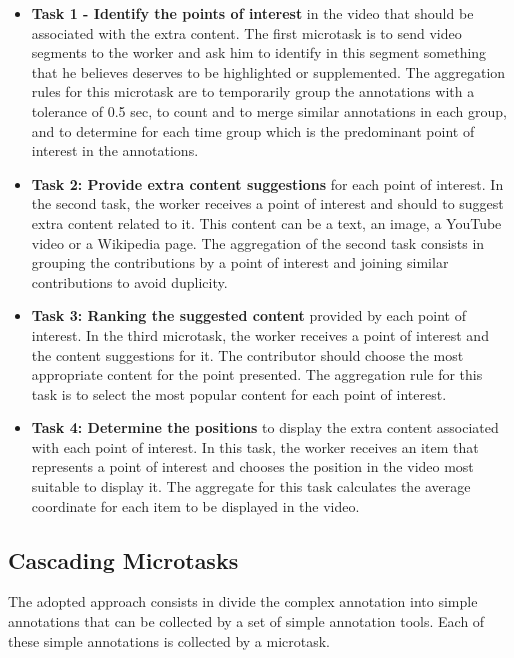 \begin{itemize}
\item \textbf{Task 1 - Identify the points of interest} in the video that should be associated with the extra content. The first microtask is to send video segments to the worker and ask him to identify in this segment something that he believes deserves to be highlighted or supplemented. The aggregation rules for this microtask are to temporarily group the annotations with a tolerance of 0.5 sec, to count and to merge similar annotations in each group, and to determine for each time group which is the predominant point of interest in the annotations.

\item \textbf{Task 2: Provide extra content suggestions} for each point of interest. In the second task, the worker receives a point of interest and should to suggest extra content related to it. This content can be a text, an image, a YouTube video or a Wikipedia page. The aggregation of the second task consists in grouping the contributions by a point of interest and joining similar contributions to avoid duplicity.

\item \textbf{Task 3: Ranking the suggested content} provided by each point of interest. In the third microtask, the worker receives a point of interest and the content suggestions for it. The contributor should choose the most appropriate content for the point presented. The aggregation rule for this task is to select the most popular content for each point of interest.
	
\item \textbf{Task 4: Determine the positions} to display the extra content associated with each point of interest. In this task, the worker receives an item that represents a point of interest and chooses the position in the video most suitable to display it. The aggregate for this task calculates the average coordinate for each item to be displayed in the video.

\end{itemize}

\pagebreak


\subsection{Cascading Microtasks}
The adopted approach consists in divide the complex annotation into simple annotations that can be collected by 
a set of simple annotation tools. Each of these simple annotations is collected by a microtask.

